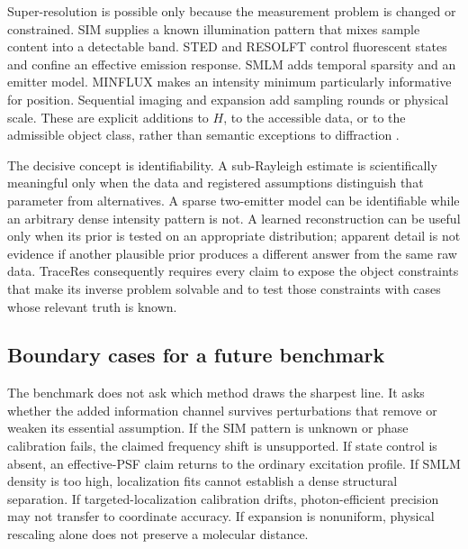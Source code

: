 \documentclass[conference]{IEEEtran}
\begin{document}
Super-resolution is possible only because the measurement problem is changed or constrained. SIM supplies a known illumination pattern that mixes sample content into a detectable band. STED and RESOLFT control fluorescent states and confine an effective emission response. SMLM adds temporal sparsity and an emitter model. MINFLUX makes an intensity minimum particularly informative for position. Sequential imaging and expansion add sampling rounds or physical scale. These are explicit additions to \(H\), to the accessible data, or to the admissible object class, rather than semantic exceptions to diffraction \cite{hell2015,huang2010,balzarotti2017,reinhardt2023}.

The decisive concept is identifiability. A sub-Rayleigh estimate is scientifically meaningful only when the data and registered assumptions distinguish that parameter from alternatives. A sparse two-emitter model can be identifiable while an arbitrary dense intensity pattern is not. A learned reconstruction can be useful only when its prior is tested on an appropriate distribution; apparent detail is not evidence if another plausible prior produces a different answer from the same raw data. TraceRes consequently requires every claim to expose the object constraints that make its inverse problem solvable and to test those constraints with cases whose relevant truth is known.

\subsection{Boundary cases for a future benchmark}

The benchmark does not ask which method draws the sharpest line. It asks whether the added information channel survives perturbations that remove or weaken its essential assumption. If the SIM pattern is unknown or phase calibration fails, the claimed frequency shift is unsupported. If state control is absent, an effective-PSF claim returns to the ordinary excitation profile. If SMLM density is too high, localization fits cannot establish a dense structural separation. If targeted-localization calibration drifts, photon-efficient precision may not transfer to coordinate accuracy. If expansion is nonuniform, physical rescaling alone does not preserve a molecular distance.
\end{document}
